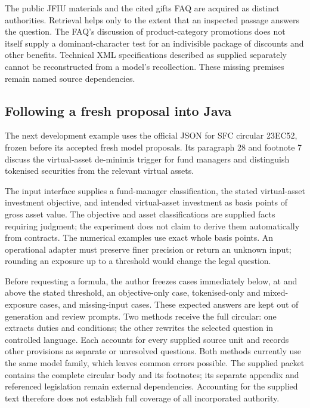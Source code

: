 The public JFIU materials and the cited gifts FAQ are acquired as distinct
authorities. Retrieval helps only to the extent that an inspected passage
answers the question. The FAQ's discussion of product-category promotions does
not itself supply a dominant-character test for an indivisible package of
discounts and other benefits. Technical XML specifications described as supplied
separately cannot be reconstructed from a model's recollection. These missing
premises remain named source dependencies.~\cite{jfiu2026transition,sfcgiftfaq}

\subsection{Following a fresh proposal into Java}

The next development example uses the official JSON for SFC circular 23EC52,
frozen before its accepted fresh model proposals. Its paragraph 28 and footnote
7 discuss the virtual-asset de-minimis trigger for fund managers and distinguish
tokenised securities from the relevant virtual assets.~\cite{sfctokenised2023}

The input interface supplies a
fund-manager classification, the stated virtual-asset investment objective,
and intended virtual-asset investment as basis points of gross asset value.
The objective and asset classifications are supplied facts requiring judgment;
the experiment does not claim to derive them automatically from contracts.
The numerical examples use exact whole basis points. An operational adapter
must preserve finer precision or return an unknown input; rounding an exposure
up to a threshold would change the legal question.

Before requesting a formula, the author freezes cases immediately below, at
and above the stated threshold, an objective-only case, tokenised-only and
mixed-exposure cases, and missing-input cases. These expected answers are kept
out of generation and review prompts. Two methods receive the full circular:
one extracts duties and conditions; the other rewrites the selected question
in controlled language. Each accounts for every supplied source unit and
records other provisions as separate or unresolved questions. Both methods
currently use the same model family, which leaves common errors possible.
The supplied packet contains the complete circular body and its footnotes;
its separate appendix and referenced legislation remain external dependencies.
Accounting for the supplied text therefore does not establish full coverage
of all incorporated authority.

